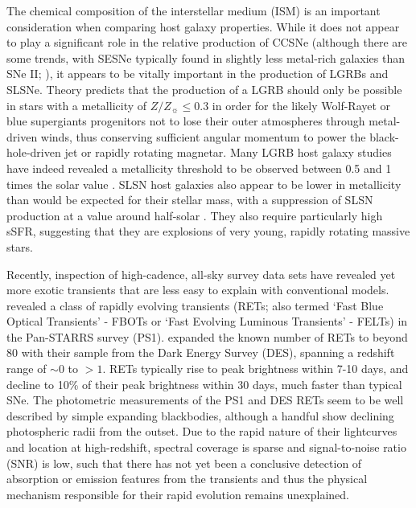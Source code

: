 \documentclass[fleqn,usenatbib,]{mnras}
\begin{document}
 The chemical composition of the interstellar medium (ISM) is an important consideration when comparing host galaxy properties. While it does not appear to play a significant role in the relative production of CCSNe (although there are some trends, with SESNe typically found in slightly less metal-rich galaxies than SNe II; \citealt{Galbany2018}), it appears to be vitally important in the production of LGRBs and SLSNe. Theory predicts that the production of a LGRB should only be possible in stars with a metallicity of $Z/Z_{\sun}\leq 0.3$ \citep{Woosley1993}  in order for the likely Wolf-Rayet or blue supergiants progenitors not to lose their outer atmospheres through metal-driven winds, thus conserving sufficient angular momentum to power the black-hole-driven jet or rapidly rotating magnetar. Many LGRB host galaxy studies have indeed revealed a metallicity threshold to be observed between 0.5 and 1 times the solar value \citep[e.g.][]{Stanek2006,Modjaz2008,Kruehler2015,Perley2016b,Japelj2016,Vergani2017}.  
SLSN host galaxies also appear to be lower in metallicity than would be expected for their stellar mass, with a suppression of SLSN production at a value around half-solar \citep{Lunnan2014,Chen2016a,Perley2016c}. They also require particularly high sSFR, suggesting that they are explosions of very young, rapidly rotating massive stars.
 
Recently, inspection of high-cadence, all-sky survey data sets have revealed yet more exotic transients that are less easy to explain with conventional models. \citet{Drout2014} revealed a class of rapidly evolving transients (RETs; also termed `Fast Blue Optical Transients' - FBOTs or `Fast Evolving Luminous Transients' - FELTs) in the Pan-STARRS survey (PS1). \citet{Pursiainen2018} expanded the known number of RETs to beyond 80 with their sample from the Dark Energy Survey (DES), spanning a redshift range of $\sim 0$ to $>1$. RETs typically rise to peak brightness within 7-10 days, and decline to 10\% of their peak brightness within 30 days, much faster than typical SNe. The photometric measurements of the PS1 and DES RETs seem to be well described by simple expanding blackbodies, although a handful show declining photospheric radii from the outset. Due to the rapid nature of their lightcurves and location at high-redshift, spectral coverage is sparse and signal-to-noise ratio (SNR) is low, such that there has not yet been a conclusive detection of absorption or emission features from the transients and thus the physical mechanism responsible for their rapid evolution remains unexplained.
\end{document}

